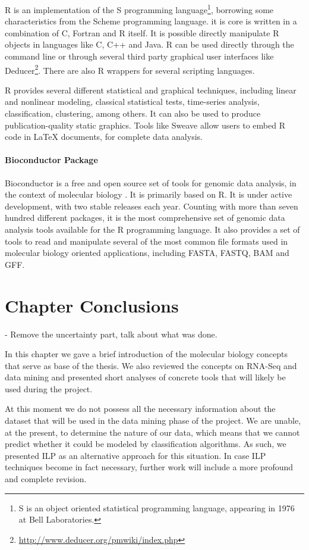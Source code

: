 R is an implementation of the S programming language\footnote{S is an object
oriented statistical programming language, appearing in 1976 at Bell
Laboratories.}, borrowing some characteristics from the Scheme programming
language. it is core is written in a combination of C, Fortran and R itself. It
is possible directly manipulate R objects in languages like C, C++ and Java. R
can be used directly through the command line or through several third party
graphical user interfaces like
Deducer\footnote{\url{http://www.deducer.org/pmwiki/index.php}}. There are also
R wrappers for several scripting languages.

R provides several different statistical and graphical techniques, including
linear and nonlinear modeling, classical statistical tests, time-series
analysis, classification, clustering, among others. It can also be used to
produce publication-quality static graphics. Tools like Sweave
\cite{lmucs-papers:Leisch:2002} allow users to embed R code in \LaTeX{}
documents, for complete data analysis.

\paragraph{Bioconductor Package}

Bioconductor is a free and open source set of tools for genomic data analysis,
in the context of molecular biology \cite{lmucs-papers:Leisch:2002}. It is
primarily based on R. It is under active development, with two stable releases
each year. Counting with more than seven hundred different packages, it is the
most comprehensive set of genomic data analysis tools available for the R
programming language. It also provides a set of tools to read and manipulate
several of the most common file formats used in molecular biology oriented
applications, including FASTA, FASTQ, BAM and GFF.

\section{Chapter Conclusions}

\begin{Notes}
- Remove the uncertainty part, talk about what was done.\\
\end{Notes}

In this chapter we gave a brief introduction of the molecular biology concepts
that serve as base of the thesis. We also reviewed the concepts on RNA-Seq and
data mining and presented short analyses of concrete tools that will likely be
used during the project.

At this moment we do not possess all the necessary information about the dataset
that will be used in the data mining phase of the project. We are unable, at the
present, to determine the nature of our data, which means that we cannot predict
whether it could be modeled by classification algorithms. As such, we presented
ILP as an alternative approach for this situation. In case ILP techniques become
in fact necessary, further work will include a more profound and complete
revision.

